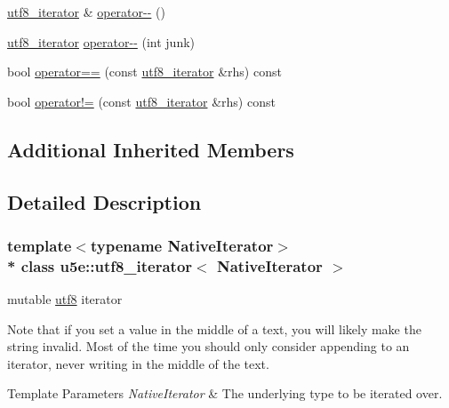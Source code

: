 {\bf }\par
\begin{DoxyCompactItemize}
\item 
\hyperlink{classu5e_1_1utf8__iterator}{utf8\+\_\+iterator} \& \hyperlink{classu5e_1_1utf8__iterator_a861465404fbc47279b05af200372484d}{operator-\/-\/} ()
\item 
\hyperlink{classu5e_1_1utf8__iterator}{utf8\+\_\+iterator} \hyperlink{classu5e_1_1utf8__iterator_a96fb0763063cb54e94fac8c201f7367d}{operator-\/-\/} (int junk)
\end{DoxyCompactItemize}

{\bf }\par
\begin{DoxyCompactItemize}
\item 
bool \hyperlink{classu5e_1_1utf8__iterator_a8a19d76a5cff4853f4f281bc330c00e6}{operator==} (const \hyperlink{classu5e_1_1utf8__iterator}{utf8\+\_\+iterator} \&rhs) const 
\item 
bool \hyperlink{classu5e_1_1utf8__iterator_a64020160892753ed7628728836bc9555}{operator!=} (const \hyperlink{classu5e_1_1utf8__iterator}{utf8\+\_\+iterator} \&rhs) const 
\end{DoxyCompactItemize}

\subsection*{Additional Inherited Members}


\subsection{Detailed Description}
\subsubsection*{template$<$typename Native\+Iterator$>$\\*
class u5e\+::utf8\+\_\+iterator$<$ Native\+Iterator $>$}

mutable \hyperlink{classu5e_1_1utf8}{utf8} iterator 

Note that if you set a value in the middle of a text, you will likely make the string invalid. Most of the time you should only consider appending to an iterator, never writing in the middle of the text. 
\begin{DoxyTemplParams}{Template Parameters}
{\em Native\+Iterator} & The underlying type to be iterated over. \\
\hline
\end{DoxyTemplParams}


